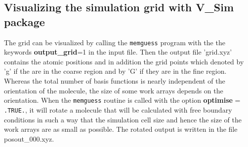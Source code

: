 \documentclass[a4paper,11pt]{report}
\begin{document}
\subsection{Visualizing the simulation grid with V\_Sim package}
The grid can be visualized by calling the \texttt{memguess} program 
with the the keywords {\bf output\_grid}=1 in the input file. Then the output file 'grid.xyz' contains the atomic positions and in addition 
the grid points which denoted by 'g' if the are in the coarse region and by 'G' if they are in the fine region. 
Whereas the total number of basis functions is nearly independent of the orientation of the molecule, the size of some 
work arrays depends on the orientation. When the \texttt{memguess} routine is called with the option {\bf optimise} = \texttt{.TRUE.}, it will rotate 
a molecule that will be calculated with free boundary conditions in such a way that the simulation cell size and 
hence the size of the work arrays are as small as 
possible. The rotated output is written in the file posout\_000.xyz.
\end{document}
